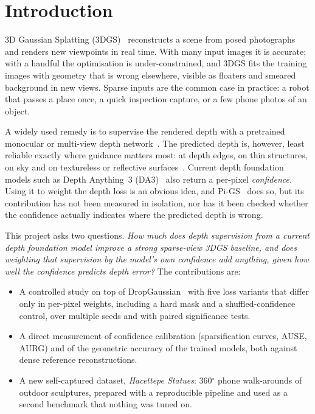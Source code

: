 \section{Introduction}

3D Gaussian Splatting (3DGS)~\cite{kerbl2023} reconstructs a scene from posed photographs and renders new viewpoints in real time. With many input images it is accurate; with a handful the optimisation is under-constrained, and 3DGS fits the training images with geometry that is wrong elsewhere, visible as floaters and smeared background in new views. Sparse inputs are the common case in practice: a robot that passes a place once, a quick inspection capture, or a few phone photos of an object.

A widely used remedy is to supervise the rendered depth with a pretrained monocular or multi-view depth network~\cite{dsnerf,fsgs,dngaussian}. The predicted depth is, however, least reliable exactly where guidance matters most: at depth edges, on thin structures, on sky and on textureless or reflective surfaces~\cite{indepth}. Current depth foundation models such as Depth Anything~3 (DA3)~\cite{da3} also return a per-pixel \emph{confidence}. Using it to weight the depth loss is an obvious idea, and Pi-GS~\cite{pigs} does so, but its contribution has not been measured in isolation, nor has it been checked whether the confidence actually indicates where the predicted depth is wrong.

This project asks two questions. \emph{How much does depth supervision from a current depth foundation model improve a strong sparse-view 3DGS baseline, and does weighting that supervision by the model's own confidence add anything, given how well the confidence predicts depth error?} The contributions are:
\begin{itemize}
\item A controlled study on top of DropGaussian~\cite{dropgaussian} with five loss variants that differ only in per-pixel weights, including a hard mask and a shuffled-confidence control, over multiple seeds and with paired significance tests.
\item A direct measurement of confidence calibration (sparsification curves, AUSE, AURG) and of the geometric accuracy of the trained models, both against dense reference reconstructions.
\item A new self-captured dataset, \emph{Hacettepe Statues}: \statuesnscenes{} 360$^\circ$ phone walk-arounds of outdoor sculptures, prepared with a reproducible pipeline and used as a second benchmark that nothing was tuned on.
\end{itemize}

